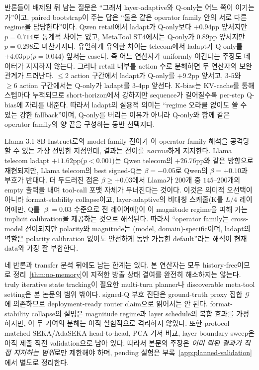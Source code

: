 반론들이 배제된 뒤 남는 질문은 ``그래서 layer-adaptive와 Q-only는 어느 쪽이 이기는가''이고, paired bootstrap이 주는 답은 ``둘은 같은 operator family 안의 서로 다른 regime을 담당한다''이다. Qwen retail에서 ladapt가 Q-only보다 $+0.94$pp 앞서지만 $p=0.714$로 통계적 차이는 없고, MetaTool ST4에서는 Q-only가 $0.89$pp 앞서지만 $p=0.298$로 마찬가지다. 유일하게 유의한 차이는 telecom에서 ladapt가 Q-only를 $+4.03$pp($p=0.044$) 앞서는 case다. 즉 어느 연산자가 uniformly 이긴다는 주장도 데이터가 지지하지 않는다. 그러나 retail 내부를 action 수로 분해하면 두 연산자의 보완 관계가 드러난다. $\le 2$ action 구간에서 ladapt가 Q-only를 $+9.2$pp 앞서고, $3$-$5$와 $\ge 6$ action 구간에서는 Q-only가 ladapt를 $3$-$4$pp 앞선다. K-bias는 KV-cache를 통해 스텝마다 누적되므로 short-horizon에서 강하지만 sequence가 길어질수록 per-step Q-bias에 자리를 내준다. 따라서 ladapt의 실용적 의미는 ``regime 오라클 없이도 쓸 수 있는 강한 fallback''이며, Q-only를 버리는 이유가 아니라 Q-only와 함께 같은 operator family의 양 끝을 구성하는 동반 선택지다.

Llama-3.1-8B-Instruct로의 model-family 전이가 이 operator family 해석을 공격당할 수 있는 가장 선명한 지점인데, 결과는 전이를 \emph{narrow}하게 지지한다. Llama telecom ladapt $+11.62$pp($p<0.001$)는 Qwen telecom의 $+26.76$pp와 같은 방향으로 재현되지만, Llama telecom의 best signed-Q는 $\beta{=}{-}0.05$로 Qwen의 $\beta{=}{+}0.10$과 부호가 반대다. 더 두드러진 점은 $\beta{\ge}{+}0.03$에서 Llama가 $200$개 중 $145$--$200$개의 empty 출력을 내며 tool-call 포맷 자체가 무너진다는 것이다. 이것은 의미적 오선택이 아니라 format-stability collapse이고, layer-adaptive의 비대칭 스케줄(K를 $L/4$ 레이어에만, Q를 $|\beta|{=}0.03$ 수준으로 전 레이어에)이 이 magnitude regime을 피해 가는 implicit calibration을 제공하는 것으로 해석된다. 따라서 ``operator family는 cross-model 전이되지만 polarity와 magnitude는 (model, domain)-specific이며, ladapt의 역할은 polarity calibration 없이도 안전하게 동반 가능한 default''라는 해석이 현재 data와 가장 잘 부합한다.

네 반론과 transfer 분석 뒤에도 남는 한계는 있다. 본 연산자는 모두 history-free이므로 정리~\ref{thm:no-memory}이 지적한 방출 상태 결여를 완전히 해소하지는 않는다. truly iterative state tracking이 필요한 multi-turn planner나 discoverable meta-tool setting은 본 논문의 범위 밖이다. signed-Q 부호 진단은 ground-truth proxy 집합 $\mathcal{G}$에 의존하므로 deployment-ready router claim으로 읽어서는 안 된다. format-stability collapse의 설명은 magnitude regime과 layer schedule의 복합 효과를 가정하지만, 이 두 기여의 분해는 아직 실험적으로 격리하지 않았다. 또한 protocol-matched SEKA/AdaSEKA head-to-head, PCA 기저 비교, layer boundary sweep은 아직 제출 직전 validation으로 남아 있다. 따라서 본문의 주장은 \emph{이미 락된 결과가 직접 지지하는 범위}로만 제한해야 하며, pending 실험은 부록~\ref{app:planned-validation}에서 별도로 정리한다.

